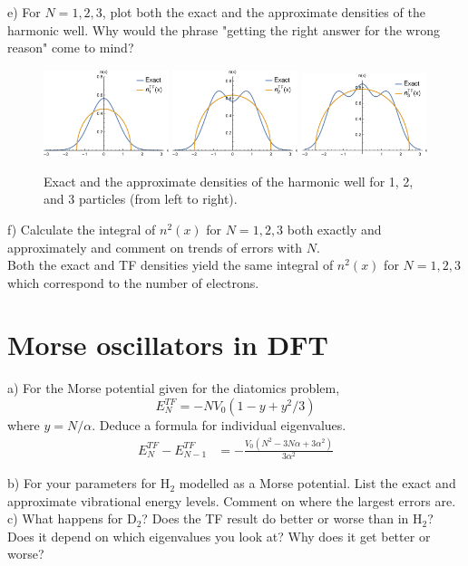 \documentclass{article}
\begin{document}
\noindent e) For $N=1,2,3$, plot both the exact and the approximate densities
of the harmonic well. Why would the phrase "getting the right answer for the
wrong reason" come to mind?
\\
\begin{figure}[H]
  \centering
  \includegraphics[width=0.325\textwidth]{ho1_compare.eps}
  \includegraphics[width=0.325\textwidth]{ho2_compare.eps}
  \includegraphics[width=0.325\textwidth]{ho3_compare.eps}
  \caption{Exact and the approximate densities of the harmonic well for
    1, 2, and 3 particles (from left to right).}
\end{figure}

\noindent f) Calculate the integral of $n^2(x)$ for $N=1,2,3$ both exactly
and approximately and comment on trends of errors with $N$.
\\
 
{\color{blue} Both the exact and TF densities yield the same integral of
  $n^2(x)$ for $N=1,2,3$ which correspond to the number of electrons.
}
\pagebreak
\section*{Morse oscillators in DFT}

\noindent a) For the Morse potential given for the diatomics problem, 
$$E^{TF}_N = - N V_0 (1-y+y^2/3)$$
where $y=N/\alpha$.  Deduce a formula for individual eigenvalues.
{\color{blue}
  \begin{align}
    E^{TF}_N - E^{TF}_{N-1} & = - \frac{V_0(N^2-3N\alpha+3\alpha^2)}{3\alpha^2}
  \end{align}
}

\noindent b) For your parameters for H$_2$ modelled as a Morse potential. 
List the exact and approximate vibrational energy levels.  Comment on where the
largest errors are.
\\



\noindent c) What happens for D$_2$?  Does the TF result do better or worse than in H$_2$?  Does
it depend on which eigenvalues you look at?  Why does it get better or worse?
\\
\end{document}

